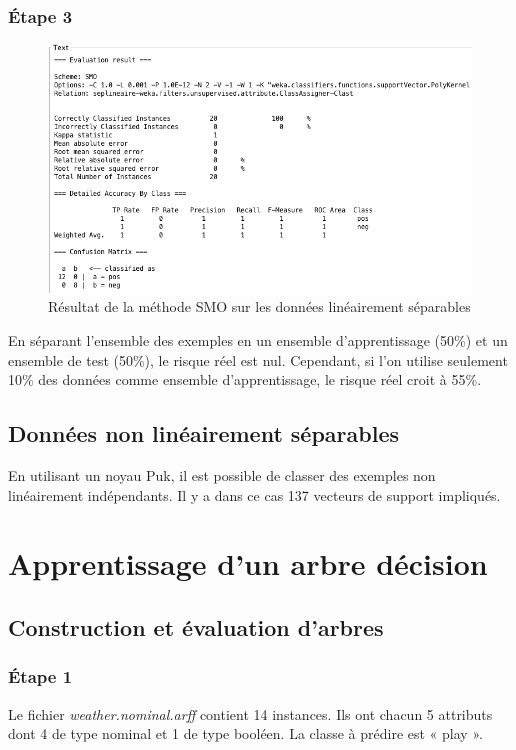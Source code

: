 \documentclass[a4paper,12pt]{article}
\begin{document}
\subsubsection*{\'Etape 3}
\begin{figure}
	\center
	\includegraphics[width=1\textwidth]{SVM-table.png}
	\caption{Résultat de la méthode SMO sur les données linéairement séparables}
	\label{fig:svm-table}
\end{figure}
En séparant l’ensemble des exemples en un ensemble d’apprentissage (50\%) et un ensemble de test (50\%), le risque réel est nul.
Cependant, si l’on utilise seulement 10\% des données comme ensemble d’apprentissage, le risque réel croit à 55\%.


\subsection{Données non linéairement séparables}

En utilisant un noyau Puk, il est possible de classer des exemples non linéairement indépendants.
Il y a dans ce cas 137 vecteurs de support impliqués.

\section{Apprentissage d'un arbre décision}


\subsection{Construction et évaluation d'arbres}

\subsubsection*{\'Etape 1}
Le fichier \textit{weather.nominal.arff} contient 14 instances.
Ils ont chacun 5 attributs dont 4 de type nominal et 1 de type booléen.
La classe à prédire est « play ».
\end{document}

